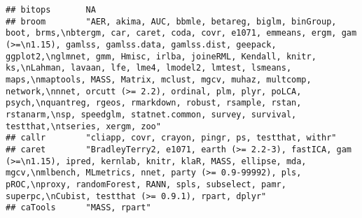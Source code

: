 \documentclass[]{article}
\begin{document}
\begin{verbatim}
## bitops       NA                                                                                                                                                                                                                                                                                                                                                                                                                                                                                                                                                                                        
## broom        "AER, akima, AUC, bbmle, betareg, biglm, binGroup, boot, brms,\nbtergm, car, caret, coda, covr, e1071, emmeans, ergm, gam (>=\n1.15), gamlss, gamlss.data, gamlss.dist, geepack, ggplot2,\nglmnet, gmm, Hmisc, irlba, joineRML, Kendall, knitr, ks,\nLahman, lavaan, lfe, lme4, lmodel2, lmtest, lsmeans, maps,\nmaptools, MASS, Matrix, mclust, mgcv, muhaz, multcomp, network,\nnnet, orcutt (>= 2.2), ordinal, plm, plyr, poLCA, psych,\nquantreg, rgeos, rmarkdown, robust, rsample, rstan, rstanarm,\nsp, speedglm, statnet.common, survey, survival, testthat,\ntseries, xergm, zoo"
## callr        "cliapp, covr, crayon, pingr, ps, testthat, withr"                                                                                                                                                                                                                                                                                                                                                                                                                                                                                                                                        
## caret        "BradleyTerry2, e1071, earth (>= 2.2-3), fastICA, gam (>=\n1.15), ipred, kernlab, knitr, klaR, MASS, ellipse, mda, mgcv,\nmlbench, MLmetrics, nnet, party (>= 0.9-99992), pls, pROC,\nproxy, randomForest, RANN, spls, subselect, pamr, superpc,\nCubist, testthat (>= 0.9.1), rpart, dplyr"                                                                                                                                                                                                                                                                                              
## caTools      "MASS, rpart"                                                                                                                                                                                                                                                                                                                                                                                                                                                                                                                                                                             

\end{verbatim}
\end{document}
